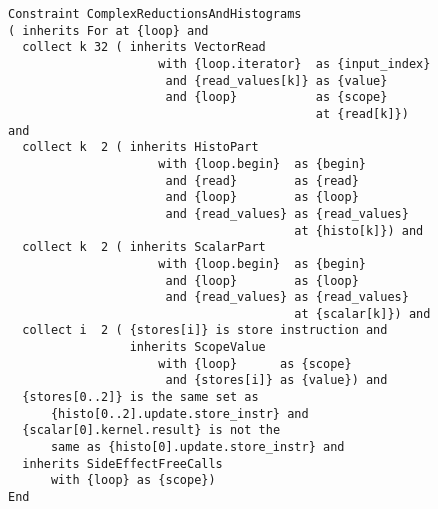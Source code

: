 \begin{figure}[h]
\begin{lstlisting}[language=IDL,basicstyle=\linespread{0.8}\ttfamily,
                   captionpos=t,caption=
   {Constraint specification of Complex Reduction and Histogram Computations in
    IDL
    \parfillskip=0pt}]
Constraint ComplexReductionsAndHistograms
( inherits For at {loop} and
  collect k 32 ( inherits VectorRead
                     with {loop.iterator}  as {input_index}
                      and {read_values[k]} as {value}
                      and {loop}           as {scope}
                                           at {read[k]}) and
  collect k  2 ( inherits HistoPart
                     with {loop.begin}  as {begin}
                      and {read}        as {read}
                      and {loop}        as {loop}
                      and {read_values} as {read_values}
                                        at {histo[k]}) and
  collect k  2 ( inherits ScalarPart
                     with {loop.begin}  as {begin}
                      and {loop}        as {loop}
                      and {read_values} as {read_values}
                                        at {scalar[k]}) and
  collect i  2 ( {stores[i]} is store instruction and
                 inherits ScopeValue
                     with {loop}      as {scope}
                      and {stores[i]} as {value}) and
  {stores[0..2]} is the same set as
      {histo[0..2].update.store_instr} and
  {scalar[0].kernel.result} is not the
      same as {histo[0].update.store_instr} and
  inherits SideEffectFreeCalls
      with {loop} as {scope})
End
\end{lstlisting}
\end{figure}
